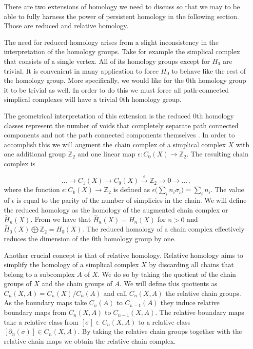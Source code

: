 There are two extensions of homology we need to discuss so that we may to be able to fully harness the power of persistent homology in the following section. Those are reduced and relative homology.

The need for reduced homology arises from a slight inconsistency in the interpretation of the homology groups. Take for example the simplical complex that consists of a single vertex. All of its homology groups except for $H_0$ are trivial. It is convenient in many application to force $H_0$ to behave like the rest of the homology group. More specifically, we would like for the 0th homology group it to be trivial as well. In order to do this we must force all path-connected simplical complexes will have a trivial 0th homology group.

The geometrical interpretation of this extension is the reduced 0th homology classes represent the number of voids that completely separate path connected components and not the path connected components themselves \cite{comp-topo}. In order to accomplish this we will augment the chain complex of a simplical complex $X$ with one additional group $\mathbb{Z}_2$ and one linear map $\epsilon : C_0(X) \to \mathbb{Z}_2$. The resulting chain complex is

$$ ... \longrightarrow C_1(X) \longrightarrow C_0(X) \overset{\epsilon}{\longrightarrow} \mathbb{Z}_2 \longrightarrow 0 \longrightarrow ...~, $$
where the function $\epsilon: C_0(X) \to \mathbb{Z}_2$ is defined as $\epsilon\big(\sum_{i}n_i\sigma_i\big) = \sum_{i}n_i$. The value of $\epsilon$ is equal to the parity of the number of simplicies in the chain. We will define the reduced homology as the homology of the augmented chain complex or $\overset{\sim}{H}_n(X)$. From \cite{algebraic-topology} we have that $\overset{\sim}{H}_n(X) = H_n(X)$ for $n > 0$ and $\overset{\sim}{H}_0(X) \bigoplus \mathbb{Z}_2 = H_0(X)$. The reduced homology of a chain complex effectively reduces the dimension of the 0th homology group by one.

Another crucial concept is that of relative homology. Relative homology aims to simplify the homology of a simplical complex $X$ by discarding all chains that belong to a subcomplex $A$ of $X$. We do so by taking the quotient of the chain groups of $X$ and the chain groups of $A$. We will define this quotients as $C_n(X, A) = C_n(X) / C_n(A)$ and call $C_n(X, A)$ the relative chain groups. As the boundary maps take $C_n(A)$ to $C_{n-1}(A)$ they induce relative boundary maps from $C_n(X, A)$ to $C_{n-1}(X, A)$. The relative boundary maps take a relative class from $[\sigma] \in C_n(X, A)$ to a relative class $[\partial_n(\sigma)] \in C_n(X, A)$. By taking the relative chain groups together with the relative chain maps we obtain the relative chain complex.

